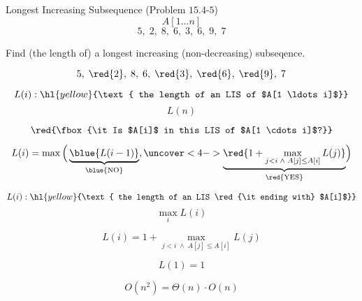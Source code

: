 
\begin{frame}{}
  \begin{exampleblock}{Longest Increasing Subsequence (Problem $15.4$-$5$)}
    \[
      A[1 \ldots n] 
    \]
    \[
      5,\; 2,\; 8,\; 6,\; 3,\; 6,\; 9,\; 7 
    \]

    \vspace{0.20cm}
    \begin{center}
      Find (the length of) a longest increasing (non-decreasing) subseqence.
    \end{center}
    \[
      5,\; \red{2},\; 8,\; 6,\; \red{3},\; \red{6},\; \red{9},\; 7 
    \]
  \end{exampleblock}
\end{frame}

\begin{frame}{}
  \[
    L(i): \hl{yellow}{\text{ the length of an LIS of $A[1 \ldots i]$}}
  \]
  \[
    L(n)
  \]

  \pause
  \vspace{0.30cm}
  \[
    \text{\red{\fbox{\it Is $A[i]$ in this LIS of $A[1 \cdots i]$?}}}
  \]

  \pause
  \vspace{0.30cm}
  \[
    L(i) = \max \Big(\underbrace{\blue{L(i-1)}}_{\blue{\text{NO}}},
      \uncover<4->{\underbrace{\red{1 + \max_{j < i \;\land\; A[j] \le A[i]} L(j)}}_{\red{\text{YES}}}}\Big)
  \]

\end{frame}

\begin{frame}{}
  \[
    L(i): \hl{yellow}{\text{ the length of an LIS \red{\it ending with} $A[i]$}}
  \]
  \[
    \max\limits_{i} L(i)
  \]

  \pause
  \begin{center}
  \end{center}

  \pause
  \[
    L(i) = 1 + \max_{j < i \;\land\; A[j] \le A[i]} L(j)
  \]

  \pause
  \[
    L(1) = 1
  \]

  \pause
  \[
    O(n^2) = \Theta(n) \cdot O(n)
  \]
\end{frame}

